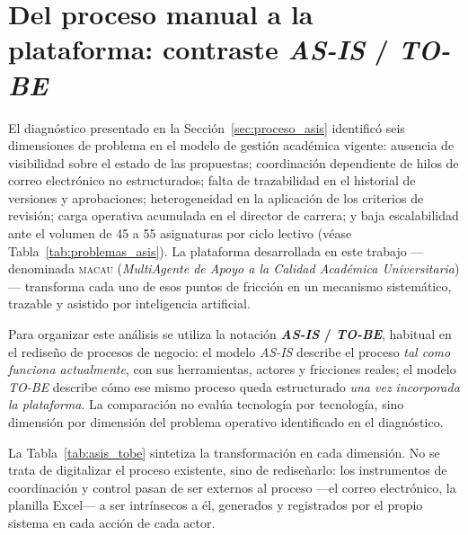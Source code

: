 \section{Del proceso manual a la plataforma: contraste \textit{AS-IS} / \textit{TO-BE}}
\label{sec:asis_tobe}

El diagnóstico presentado en la Sección~\ref{sec:proceso_asis} identificó seis dimensiones de
problema en el modelo de gestión académica vigente: ausencia de visibilidad sobre el estado
de las propuestas; coordinación dependiente de hilos de correo electrónico no estructurados;
falta de trazabilidad en el historial de versiones y aprobaciones; heterogeneidad en la
aplicación de los criterios de revisión; carga operativa acumulada en el director de carrera;
y baja escalabilidad ante el volumen de 45 a 55 asignaturas por ciclo lectivo
(véase Tabla~\ref{tab:problemas_asis}).
La plataforma desarrollada en este trabajo ---denominada \textsc{macau}
(\textit{MultiAgente de Apoyo a la Calidad Académica Universitaria})---
transforma cada uno de esos puntos de fricción
en un mecanismo sistemático, trazable y asistido por inteligencia artificial.

Para organizar este análisis se utiliza la notación \textbf{\textit{AS-IS} / \textit{TO-BE}},
habitual en el rediseño de procesos de negocio:
el modelo \textit{AS-IS} describe el proceso \emph{tal como funciona actualmente},
con sus herramientas, actores y fricciones reales;
el modelo \textit{TO-BE} describe cómo ese mismo proceso queda estructurado
\emph{una vez incorporada la plataforma}.
La comparación no evalúa tecnología por tecnología, sino dimensión por dimensión
del problema operativo identificado en el diagnóstico.

La Tabla~\ref{tab:asis_tobe} sintetiza la transformación en cada dimensión.
No se trata de digitalizar el proceso existente, sino de rediseñarlo: los instrumentos
de coordinación y control pasan de ser externos al proceso ---el correo electrónico,
la planilla Excel--- a ser intrínsecos a él, generados y registrados por el propio sistema
en cada acción de cada actor.

